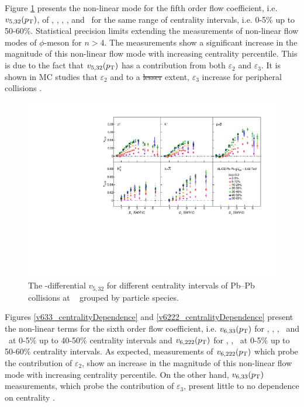 \documentclass[ALICE,manyauthors]{cernphprep}
\providecommand{\DIFaddtex}[1]{{\protect\color{blue}\uwave{#1}}} %
\providecommand{\DIFdeltex}[1]{{\protect\color{red}\sout{#1}}}                      %
\providecommand{\DIFaddbegin}{} %
\providecommand{\DIFaddend}{} %
\providecommand{\DIFdelbegin}{} %
\providecommand{\DIFdelend}{} %
\providecommand{\DIFadd}[1]{\texorpdfstring{\DIFaddtex{#1}}{#1}} %
\providecommand{\DIFdel}[1]{\texorpdfstring{\DIFdeltex{#1}}{}} %
\newcommand{\DIFscaledelfig}{0.5}
\newlength{\DIFdelgraphicswidth} %
\newlength{\DIFdelgraphicsheight} %
\newcommand{\DIFaddincludegraphics}[2][]{{\color{blue}\fbox{\DIFOincludegraphics[#1]{#2}}}} %
\newcommand{\DIFdelincludegraphics}[2][]{%
\sbox{\DIFdelgraphicsbox}{\DIFOincludegraphics[#1]{#2}}%
\settoboxwidth{\DIFdelgraphicswidth}{\DIFdelgraphicsbox} %
\settoboxtotalheight{\DIFdelgraphicsheight}{\DIFdelgraphicsbox} %
\scalebox{\DIFscaledelfig}{%
\parbox[b]{\DIFdelgraphicswidth}{\usebox{\DIFdelgraphicsbox}\\[-\baselineskip] \rule{\DIFdelgraphicswidth}{0em}}\llap{\resizebox{\DIFdelgraphicswidth}{\DIFdelgraphicsheight}{%
\setlength{\unitlength}{\DIFdelgraphicswidth}%
\begin{picture}(1,1)%
\thicklines\linethickness{2pt} %
{\color[rgb]{1,0,0}\put(0,0){\framebox(1,1){}}}%
{\color[rgb]{1,0,0}\put(0,0){\line( 1,1){1}}}%
{\color[rgb]{1,0,0}\put(0,1){\line(1,-1){1}}}%
\end{picture}%
}\hspace*{3pt}}} %
} %
\DeclareRobustCommand{\DIFaddbegin}{\DIFOaddbegin \let\includegraphics\DIFaddincludegraphics} %
\DeclareRobustCommand{\DIFaddend}{\DIFOaddend \let\includegraphics\DIFOincludegraphics} %
\DeclareRobustCommand{\DIFdelbegin}{\DIFOdelbegin \let\includegraphics\DIFdelincludegraphics} %
\DeclareRobustCommand{\DIFdelend}{\DIFOaddend \let\includegraphics\DIFOincludegraphics} %
\begin{document}
Figure \ref{v523_centralityDependence} presents the non-linear mode for the fifth order flow coefficient, i.e. $v_{5,32}(p_{\rm{T}})$, of \pion, \kaon, \Ks, \proton, and \lambdas~for the same range of centrality intervals, i.e. 0-5\% up to 50-60\%. Statistical precision limits extending the measurements of non-linear flow modes of $\phi$-meson for $n>4$. The measurements show a significant increase in the magnitude of this non-linear flow mode with increasing centrality percentile. This is due to the fact that $v_{5,32}(p_{\rm{T}})$ has a contribution from both $\varepsilon_{2}$ and $\varepsilon_{3}$. It is shown in MC studies that $\varepsilon_{2}$ and to a \DIFdelbegin \DIFdel{lesser }\DIFdelend \DIFaddbegin \DIFadd{smaller }\DIFaddend extent, $\varepsilon_{3}$ increase for peripheral collisions \cite{Alver:2010gr}. 

\begin{figure}[!htb]
\begin{center}
\includegraphics[scale=0.82]{figures/results/All_v523_gap00_CentDep_PID2.pdf}
\end{center}
\caption{The \pT-differential $v_{5,32}$ for different centrality intervals of Pb--Pb collisions at \sNN~ grouped by particle species.}
\label{v523_centralityDependence}
\end{figure}

Figures \ref{v633_centralityDependence} and \ref{v6222_centralityDependence} present the non-linear terms for the sixth order flow coefficient, i.e. $v_{6,33}(p_{\rm{T}})$ for \pion, \kaon, \Ks, \proton~and \lambdas~at 0-5\% up to 40-50\% centrality intervals and $v_{6,222}(p_{\rm{T}})$ for \pion, \kaon, \proton~at 0-5\% up to 50-60\% centrality intervals. As expected, measurements of $v_{6,222}(p_{\rm{T}})$ which probe the contribution of $\varepsilon_2$, show an increase in the magnitude of this non-linear flow mode with increasing centrality percentile. On the other hand, $v_{6,33}(p_{\rm{T}})$ measurements, which probe the contribution of $\varepsilon_3$, present little to no dependence on centrality \cite{Acharya:2017zfg}. 
\end{document}
